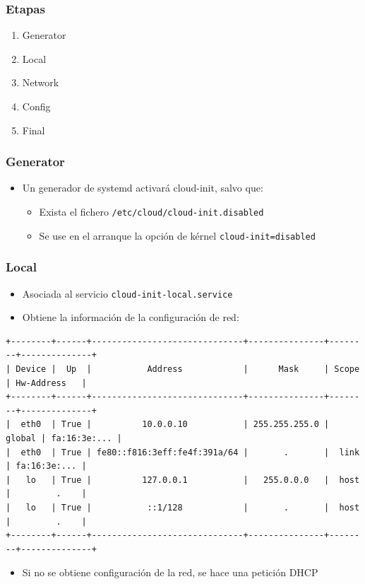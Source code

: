\documentclass[aspectratio=169]{beamer}
\begin{document}
\begin{frame}
  \frametitle{Etapas}
  \begin{enumerate}
  \item Generator
  \item Local
  \item Network
  \item Config
  \item Final
  \end{enumerate}
\end{frame}

\begin{frame}
  \frametitle{Generator}
  \begin{itemize}
  \item Un generador de systemd activará cloud-init, salvo que:
    \begin{itemize}
    \item Exista el fichero \texttt{/etc/cloud/cloud-init.disabled}
    \item Se use en el arranque la opción de kérnel \texttt{cloud-init=disabled}
    \end{itemize}
  \end{itemize}
\end{frame}

\begin{frame}[fragile]
  \frametitle{Local}
  \begin{itemize}
  \item Asociada al servicio \texttt{cloud-init-local.service}
  \item Obtiene la información de la configuración de red:
  \end{itemize}
  \begin{lstlisting}
+--------+------+------------------------------+---------------+--------+--------------+
| Device |  Up  |           Address            |      Mask     | Scope  | Hw-Address   |
+--------+------+------------------------------+---------------+--------+--------------+
|  eth0  | True |          10.0.0.10           | 255.255.255.0 | global | fa:16:3e:... |
|  eth0  | True | fe80::f816:3eff:fe4f:391a/64 |       .       |  link  | fa:16:3e:... |
|   lo   | True |          127.0.0.1           |   255.0.0.0   |  host  |         .    |
|   lo   | True |           ::1/128            |       .       |  host  |         .    |
+--------+------+------------------------------+---------------+--------+--------------+
\end{lstlisting}
\begin{itemize}
\item Si no se obtiene configuración de la red, se hace una petición DHCP
\end{itemize}
\end{frame}
\end{document}
